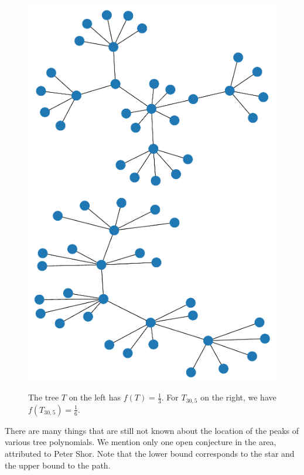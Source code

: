 \documentclass[11pt,english]{article}
\theoremstyle{plain}
\theoremstyle{remark}
\begin{document}
\begin{figure}[hbt]
    \centering
    \includegraphics[scale=0.4]{tree30.pdf}
    \hspace{0.5in}
    \includegraphics[scale=0.4]{t30_5.pdf}
    \caption{The tree $T$ on the left has $f(T)=\frac{1}{3}$. For $T_{30,5}$ on the right, we have $f(T_{30,5})=\frac{1}{6}$.}
    \label{fig:tree30}
\end{figure}

There are many things that are still not known about the location of the peaks of various tree polynomials. We mention only one open conjecture in the area, attributed to Peter Shor. Note that the lower bound corresponds to the star and the upper bound to the path.
\end{document}
